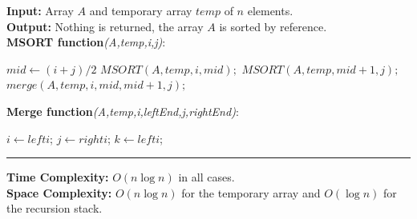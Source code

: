 \newpage

\begin{Func}
    \textbf{Input:} Array $A$ and temporary array $temp$ of $n$ elements.\\
    \textbf{Output:} Nothing is returned, the array $A$ is sorted by reference.\\

    \vspace{-.5em}
    \noindent
    \textbf{MSORT function}\textit{(A,temp,i,j)}:\\
    \begin{algorithm}[H]
        \label{algo:mergesort}
            $mid \gets (i + j) / 2$\;
            $MSORT(A, temp, i, mid);$ 
            $MSORT(A, temp, mid + 1, j);$ 
            $merge(A, temp, i, mid, mid + 1, j);$ 
        
    \end{algorithm}

    \vspace{.5em}

    \noindent
    \textbf{Merge function}\textit{(A,temp,i,leftEnd,j,rightEnd)}:\\
    \begin{algorithm}[H]
        $i \gets lefti$; 
        $j \gets righti$; 
        $k \gets lefti$; 
        
        
        
        
    \end{algorithm}

    \noindent\rule{\textwidth}{0.4pt}

    \noindent
    \textbf{Time Complexity:} $O(n \log n)$ in all cases.\\
    \textbf{Space Complexity:} $O(n \log n)$ for the temporary array and $O(\log n)$ for the recursion stack.
\end{Func}



